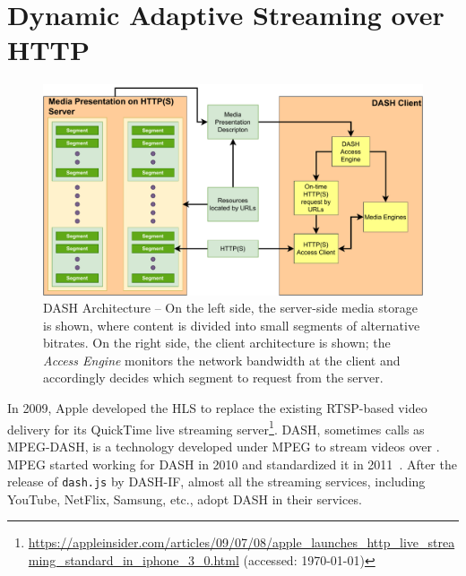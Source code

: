 \section{Dynamic Adaptive Streaming over HTTP}
\begin{figure}[!t]
	\centering
	\includegraphics[width=\linewidth]{img/DASH-arch}
	\caption{\small{DASH Architecture -- On the left side, the server-side media storage is shown, where content is divided into small segments of alternative bitrates. On the right side, the  client architecture is shown; the {\it {} Access Engine} monitors the network bandwidth at the client and accordingly decides which segment to request from the server.}}
	\label{fig:dash}
\end{figure}
In 2009, Apple developed the \ac{HLS} to replace the existing \ac{RTSP}-based video delivery for its QuickTime live streaming server\footnote{\url{https://appleinsider.com/articles/09/07/08/apple_launches_http_live_streaming_standard_in_iphone_3_0.html} (accessed: \today)}. \Ac{DASH}, sometimes calls as MPEG-DASH, is a technology developed under MPEG to stream videos over . MPEG started working for DASH in 2010 and standardized it in 2011~\cite{ISO/IEC23009-1:2019}. After the release of {\tt dash.js} by \ac{DASH-IF}, almost all the streaming services, including YouTube, NetFlix, Samsung, etc., adopt \ac{DASH} in their services.

